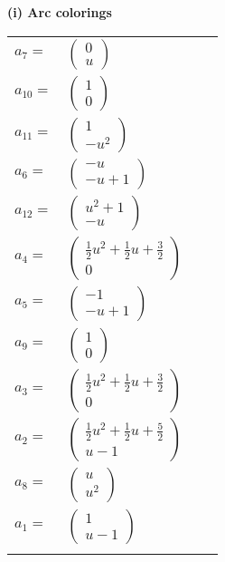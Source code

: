 \documentclass[1p]{elsarticle_modified}
\theoremstyle{definition}
\begin{document}
\flushleft \textbf{(i) Arc colorings}\\
\begin{tabular}{m{7pt} m{180pt} m{7pt} m{180pt} }
\flushright $a_{7}=$&$\begin{pmatrix}0\\u\end{pmatrix}$ \\
\flushright $a_{10}=$&$\begin{pmatrix}1\\0\end{pmatrix}$ \\
\flushright $a_{11}=$&$\begin{pmatrix}1\\- u^2\end{pmatrix}$ \\
\flushright $a_{6}=$&$\begin{pmatrix}- u\\- u+1\end{pmatrix}$ \\
\flushright $a_{12}=$&$\begin{pmatrix}u^2+1\\- u\end{pmatrix}$ \\
\flushright $a_{4}=$&$\begin{pmatrix}\frac{1}{2} u^2+\frac{1}{2} u+\frac{3}{2}\\0\end{pmatrix}$ \\
\flushright $a_{5}=$&$\begin{pmatrix}-1\\- u+1\end{pmatrix}$ \\
\flushright $a_{9}=$&$\begin{pmatrix}1\\0\end{pmatrix}$ \\
\flushright $a_{3}=$&$\begin{pmatrix}\frac{1}{2} u^2+\frac{1}{2} u+\frac{3}{2}\\0\end{pmatrix}$ \\
\flushright $a_{2}=$&$\begin{pmatrix}\frac{1}{2} u^2+\frac{1}{2} u+\frac{5}{2}\\u-1\end{pmatrix}$ \\
\flushright $a_{8}=$&$\begin{pmatrix}u\\u^2\end{pmatrix}$ \\
\flushright $a_{1}=$&$\begin{pmatrix}1\\u-1\end{pmatrix}$\\&\end{tabular}
\end{document}

